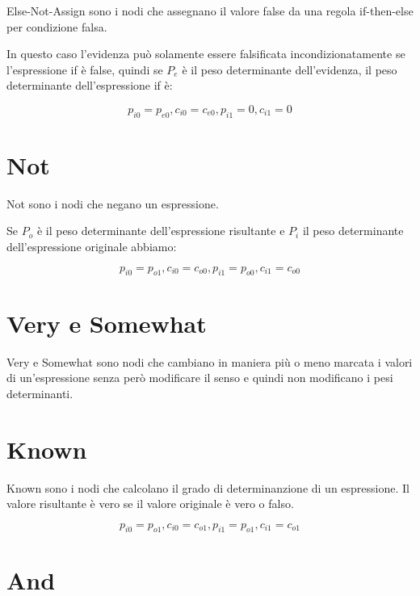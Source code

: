 \documentclass{article}
\begin{document}
  Else-Not-Assign sono i nodi che assegnano il valore false da una regola
  if-then-else per condizione falsa.
  
  In questo caso l'evidenza pu\`o solamente essere falsificata
  incondizionatamente se l'espressione if \`e false, quindi se $P_e$ \`e il
  peso determinante dell'evidenza, il peso determinante dell'espressione if
  \`e:
  
  \begin{equation}
      p_{i0}=p_{e0}, c_{i0}=c_{e0}, p_{i1}=0, c_{i1}=0
  \end{equation}
  
  \section{Not}
  
  Not sono i nodi che negano un espressione.
  
  Se $P_o$ \`e il peso determinante dell'espressione risultante e $P_i$ il
  peso determinante dell'espressione originale abbiamo:
  
  \begin{equation}
    p_{i0}=p_{o1}, c_{i0}=c_{o0}, p_{i1}=p_{o0}, c_{i1}=c_{o0}
  \end{equation}
  
  \section{Very e Somewhat}
  
  Very e Somewhat sono nodi che cambiano in maniera pi\`u o meno marcata i
  valori
  di un'espressione senza per\`o modificare il senso e quindi non modificano i
  pesi determinanti.
  
  \section{Known}
    
  Known sono i nodi che calcolano il grado di determinanzione di un espressione.
  Il valore risultante  \`e vero se il valore originale \`e vero o falso.
  
  \begin{equation}
    p_{i0}=p_{o1}, c_{i0}=c_{o1}, p_{i1}=p_{o1}, c_{i1}=c_{o1}
  \end{equation}
    
  \section{And}
    
\end{document}
